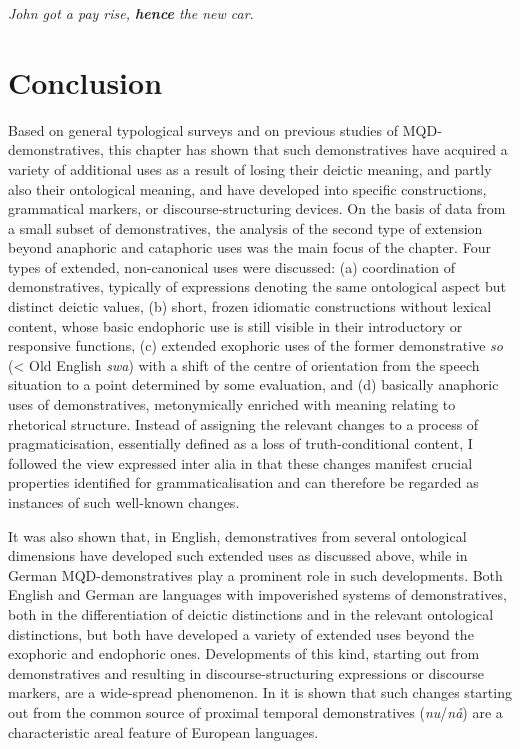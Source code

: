 \documentclass[output=paper,colorlinks,citecolor=brown]{langscibook}
\begin{document}
\ea\label{ex:koenig:20}
\textit{John got a pay rise, \textbf{hence} the new car}.\\
\z

\section{Conclusion}

Based on general typological surveys and on previous studies of MQD-demonstratives, this chapter has shown that such demonstratives have acquired a variety of additional uses as a result of losing their deictic meaning, and partly also their ontological meaning, and have developed into specific constructions, grammatical markers, or discourse-structuring devices. On the basis of data from a small subset of demonstratives, the analysis of the second type of extension beyond anaphoric and cataphoric uses was the main focus of the chapter. Four types of extended, non-canonical uses were discussed: (a) coordination of demonstratives, typically of expressions denoting the same ontological aspect but distinct deictic values, (b) short, frozen idiomatic constructions without lexical content, whose basic endophoric use is still visible in their introductory or responsive functions, (c) extended exophoric uses of the former demonstrative \textit{so} (< Old English \textit{swa}) with a shift of the centre of orientation from the speech situation to a point determined by some evaluation, and (d) basically anaphoric uses of demonstratives, metonymically enriched with meaning relating to rhetorical structure. Instead of assigning the relevant changes to a process of pragmaticisation, essentially defined as a loss of truth-conditional content, I followed the view expressed inter alia in \citet{DegandEvers-Vermeul2015} that these changes manifest crucial properties identified for grammaticalisation and can therefore be regarded as instances of such well-known changes.

It was also shown that, in English, demonstratives from several ontological dimensions have developed such extended uses as discussed above, while in German MQD-demonstratives play a prominent role in such developments. Both English and German are languages with impoverished systems of demonstratives, both in the differentiation of deictic distinctions and in the relevant ontological distinctions, but both have developed a variety of extended uses beyond the exophoric and endophoric ones. Developments of this kind, starting out from demonstratives and resulting in discourse-structuring expressions or discourse markers, are a wide-spread phenomenon. In \citet{AuerMaschler2016} it is shown that such changes starting out from the common source of proximal temporal demonstratives (\textit{nu}/\textit{nå}) are a characteristic areal feature of European languages.
\end{document}
